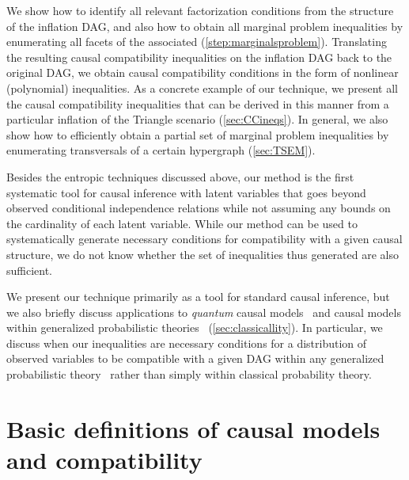 \documentclass[aps,english,10pt,superscriptaddress,onecolumn,twoside,longbibliography,pra,floatfix,fleqn,nofootinbib]{revtex4-1}%
\newcommand*{\tblue}[1]{{\color{MidnightBlue}{\textbf{#1}}}}
\theoremstyle{definition}
\newcounter{example}[section]
\begin{document}
We show how to identify all relevant factorization conditions from the structure of the inflation DAG, and also how to obtain all marginal problem inequalities by enumerating all facets of the associated \tblue{marginal polytope} (\cref{step:marginalsproblem}).  Translating the resulting causal compatibility inequalities on the inflation DAG back to the original DAG, we obtain causal compatibility conditions in the form of nonlinear (polynomial) inequalities. As a concrete example of our technique, we present all the causal compatibility inequalities that can be derived in this manner from a particular inflation of the Triangle scenario (\cref{sec:CCineqs}). In general, we also show how to efficiently obtain a partial set of marginal problem inequalities  by enumerating transversals of a certain hypergraph (\cref{sec:TSEM}). 

Besides the entropic techniques discussed above, our method is the first systematic tool for causal inference with latent variables that goes beyond observed conditional independence relations while not assuming any bounds on the cardinality of each latent variable. While our method can be used to systematically generate necessary conditions for compatibility with a given causal structure, we do not know whether the set of inequalities thus generated are also sufficient.  

We present our technique primarily as a tool for standard causal inference, but we also briefly discuss applications to {\em quantum} causal models~\cite{leifer2013conditionalstates,pusey2014gdag,BeyondBellII,Chaves2015infoquantum,ried2015quantum,costa2016quantum,allen2016quantum} and causal models within generalized probabilistic theories~\cite{pusey2014gdag} (\cref{sec:classicallity}).  In particular, we discuss when our inequalities are necessary conditions for a distribution of observed variables to be compatible with a given DAG within any generalized probabilistic theory~\cite{hardy2001quantum,barrett2007information} rather than simply within classical probability theory.


\section{Basic definitions of causal models and compatibility}\label{sec:definitions}
\end{document}
